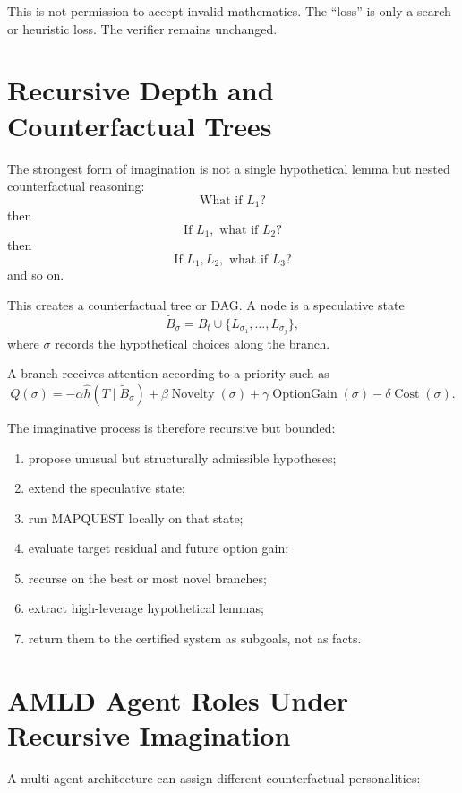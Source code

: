 \documentclass[11pt]{article}
\begin{document}
This is not permission to accept invalid mathematics. The ``loss'' is only a search or heuristic loss. The verifier remains unchanged.

\section{Recursive Depth and Counterfactual Trees}

The strongest form of imagination is not a single hypothetical lemma but nested counterfactual reasoning:
\[
\text{What if }L_1?
\]
then
\[
\text{If }L_1,\text{ what if }L_2?
\]
then
\[
\text{If }L_1,L_2,\text{ what if }L_3?
\]
and so on.

This creates a counterfactual tree or DAG. A node is a speculative state
\[
\widetilde B_{\sigma}
=
B_t\cup\{L_{\sigma_1},\dots,L_{\sigma_j}\},
\]
where $\sigma$ records the hypothetical choices along the branch.

A branch receives attention according to a priority such as
\[
Q(\sigma)
=
-\alpha\widehat h(T\mid\widetilde B_\sigma)
+\beta\operatorname{Novelty}(\sigma)
+\gamma\operatorname{OptionGain}(\sigma)
-\delta\operatorname{Cost}(\sigma).
\]

The imaginative process is therefore recursive but bounded:
\begin{enumerate}[label=(\arabic*)]
\item propose unusual but structurally admissible hypotheses;
\item extend the speculative state;
\item run MAPQUEST locally on that state;
\item evaluate target residual and future option gain;
\item recurse on the best or most novel branches;
\item extract high-leverage hypothetical lemmas;
\item return them to the certified system as subgoals, not as facts.
\end{enumerate}

\section{AMLD Agent Roles Under Recursive Imagination}

A multi-agent architecture can assign different counterfactual personalities:
\end{document}
